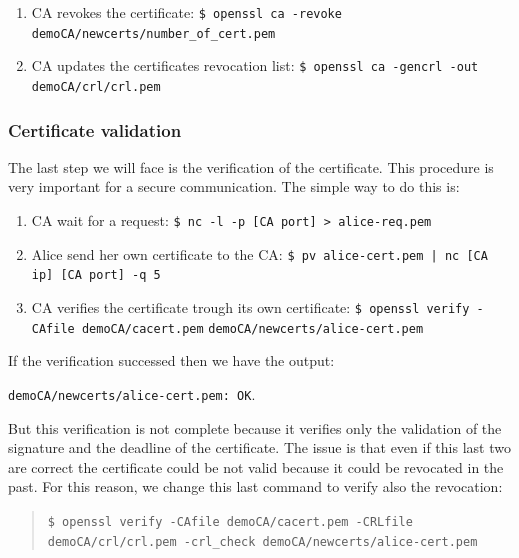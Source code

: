 \documentclass[11pt]{article}
\begin{document}
\begin{enumerate}
 \item CA revokes the certificate:\newline
 \texttt{\$ openssl ca -revoke demoCA/newcerts/number\_of\_cert.pem}

 \item CA updates the certificates revocation list:\newline
 \texttt{\$ openssl ca -gencrl -out demoCA/crl/crl.pem}\newline
\end{enumerate}

\subsubsection{Certificate validation}
The last step we will face is the verification of the certificate. This procedure is very important for a secure communication. The simple way to do this is:

\begin{enumerate}
 \item CA wait for a request:\newline
 \texttt{\$ nc -l -p [CA port] > alice-req.pem}

 \item Alice send her own certificate to the CA:\newline
 \texttt{\$ pv alice-cert.pem | nc [CA ip] [CA port] -q 5}

 \item CA verifies the certificate trough its own certificate:\newline
 \texttt{\$ openssl verify -CAfile demoCA/cacert.pem}\newline
 \texttt{demoCA/newcerts/alice-cert.pem}
\end{enumerate}

If the verification successed then we have the output:

\texttt{demoCA/newcerts/alice-cert.pem: OK}.

\bigskip
But this verification is not complete because it verifies only the validation of the signature and the deadline of the certificate. The issue is that even if this last two are correct the certificate could be not valid because it could be revocated in the past. For this reason, we change this last command to verify also the revocation:

\begin{quote}
 \texttt{\$ openssl verify -CAfile demoCA/cacert.pem -CRLfile demoCA/crl/crl.pem -crl\_check demoCA/newcerts/alice-cert.pem}
\end{quote}
\end{document}
